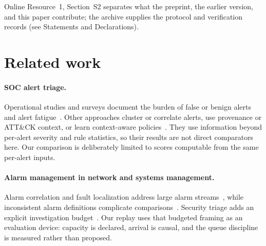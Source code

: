 \documentclass[pdflatex,sn-basic,Numbered]{sn-jnl}
\begin{document}
Online Resource~1, Section~S2 separates what the preprint, the earlier version, and this paper contribute; the archive supplies the protocol and verification records (see Statements and Declarations).

\section{Related work}
\label{sec:related}

\paragraph{SOC alert triage.} Operational studies and surveys document the burden of false or benign alerts and alert fatigue~\citep{Alahmadi2022FalsePositives,Yang2024SOCAlerts,Tariq2025AlertFatigue,Jalalvand2025AlertPrioritisation}. Other approaches cluster or correlate alerts, use provenance or ATT\&CK context, or learn context-aware policies~\citep{Julisch2003AlarmClustering,Hassan2019NoDoze,Garcia2025ROSCA,Wang2024AlertPro,vanEde2022DeepCASE}. They use information beyond per-alert severity and rule statistics, so their results are not direct comparators here. Our comparison is deliberately limited to scores computable from the same per-alert inputs.

\paragraph{Alarm management in network and systems management.} Alarm correlation and fault localization address large alarm streams~\citep{Jakobson1993AlarmCorrelation,Steinder2004FaultLocalization}, while inconsistent alarm definitions complicate comparisons~\citep{Wallin2009AlarmDefinition}. Security triage adds an explicit investigation budget~\citep{Tong2020MovingHaystack}. Our replay uses that budgeted framing as an evaluation device: capacity is declared, arrival is causal, and the queue discipline is measured rather than proposed.
\end{document}
